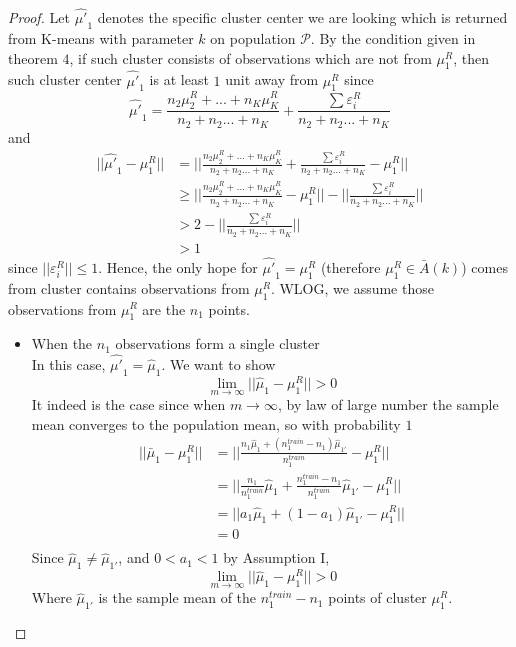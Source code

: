 \documentclass[11pt]{article}
\begin{document}
\begin{proof}
Let $\hat{\mu'}_1$ denotes the specific cluster center we are looking which is returned from K-means with parameter $k$ on population $\mathcal{P}$. By the condition given in theorem $4$, if such cluster consists of observations which are not from $\mu^R_1$, then such cluster center $\hat{\mu'}_1$ is at least $1$ unit away from $\mu^R_1$ since
\[\hat{\mu'}_1 = \frac{n_2\mu^R_2+...+n_{K}\mu^R_{K}}{n_2+n_2...+n_{K}}+\frac{\sum \varepsilon^R_i}{n_2+n_2...+n_{K}}\]
and 
\begin{align}
	||\hat{\mu'}_1-\mu^R_1|| &= ||\frac{n_2\mu^R_2+...+n_{K}\mu^R_{K}}{n_2+n_2...+n_{K}}+\frac{\sum \varepsilon^R_i}{n_2+n_2...+n_{K}}-\mu^R_1||  \nonumber \\ \nonumber
	&\geq ||\frac{n_2\mu^R_2+...+n_{K}\mu^R_{K}}{n_2+n_2...+n_{K}}-\mu^R_1||-||\frac{\sum \varepsilon^R_i}{n_2+n_2...+n_{K}}||   \\ \nonumber
	&> 2-||\frac{\sum \varepsilon^R_i}{n_2+n_2...+n_{K}}||   \\ \nonumber
	&> 1 
\end{align}
since $||\varepsilon^R_i||\leq1$. Hence, the only hope for $\hat{\mu'}_1 = \mu^R_1$ (therefore $\mu^R_1 \in \bar{A}(k)$) comes from cluster contains observations from $\mu^R_1$. WLOG, we assume those observations from $\mu^R_1$ are the $n_1$ points. 
\begin{itemize}
	\item When the $n_1$ observations form a single cluster\\
	In this case, $\hat{\mu'}_1 = \hat{\mu}_1$. We want to show 
	\begin{equation}
		 \lim_{m\to\infty}||\hat{\mu}_1-\mu^R_1|| > 0 
	\end{equation}
	It indeed is the case since when $m \to \infty$, by law of large number the sample mean converges to the population mean, so with probability $1$ 
	\begin{align}
		||\bar{\mu}_1-\mu^R_1|| &= ||\frac{n_1\hat{\mu}_1+(n^{train}_1-n_1)\hat{\mu}_{1'}}{n^{train}_1} -\mu^R_1||   \nonumber \\\nonumber		
		&= ||\frac{n_1}{n^{train}_1}\hat{\mu}_1 + \frac{n^{train}_1-n_1}{n^{train}_1}\hat{\mu}_{1'} - \mu^R_1||  \\\nonumber
		&= ||a_1\hat{\mu}_1 + (1-a_1)\hat{\mu}_{1'} - \mu^R_1 ||\\\nonumber
		&= 0\\\nonumber
    \end{align}	 
Since $\hat{\mu}_1 \neq \hat{\mu}_{1'}$, and $0<a_1<1$ by Assumption I, \[\lim_{m\to\infty}||\hat{\mu}_1-\mu^R_1|| > 0\]Where $\hat{\mu}_{1'}$ is the sample mean of the $n^{train}_1-n_1$ points of cluster $\mu^R_1$.\\

\end{itemize}
\end{proof}
\end{document}
